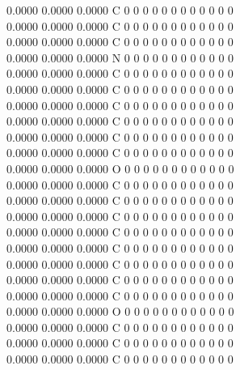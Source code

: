 \documentclass[11pt,titlepage,dvipdfmx,twoside]{article}
\begin{document}
\begin{oframed}
{    0.0000    0.0000    0.0000  C  0  0  0  0  0  0  0  0  0  0  0  0   \\
    0.0000    0.0000    0.0000  C  0  0  0  0  0  0  0  0  0  0  0  0   \\
    0.0000    0.0000    0.0000  C  0  0  0  0  0  0  0  0  0  0  0  0   \\
    0.0000    0.0000    0.0000  N  0  0  0  0  0  0  0  0  0  0  0  0   \\
    0.0000    0.0000    0.0000  C  0  0  0  0  0  0  0  0  0  0  0  0   \\
    0.0000    0.0000    0.0000  C  0  0  0  0  0  0  0  0  0  0  0  0   \\
    0.0000    0.0000    0.0000  C  0  0  0  0  0  0  0  0  0  0  0  0   \\
    0.0000    0.0000    0.0000  C  0  0  0  0  0  0  0  0  0  0  0  0   \\
    0.0000    0.0000    0.0000  C  0  0  0  0  0  0  0  0  0  0  0  0   \\
    0.0000    0.0000    0.0000  C  0  0  0  0  0  0  0  0  0  0  0  0   \\
    0.0000    0.0000    0.0000  O  0  0  0  0  0  0  0  0  0  0  0  0   \\
    0.0000    0.0000    0.0000  C  0  0  0  0  0  0  0  0  0  0  0  0   \\
    0.0000    0.0000    0.0000  C  0  0  0  0  0  0  0  0  0  0  0  0   \\
    0.0000    0.0000    0.0000  C  0  0  0  0  0  0  0  0  0  0  0  0   \\
    0.0000    0.0000    0.0000  C  0  0  0  0  0  0  0  0  0  0  0  0   \\
    0.0000    0.0000    0.0000  C  0  0  0  0  0  0  0  0  0  0  0  0   \\
    0.0000    0.0000    0.0000  C  0  0  0  0  0  0  0  0  0  0  0  0   \\
    0.0000    0.0000    0.0000  C  0  0  0  0  0  0  0  0  0  0  0  0   \\
    0.0000    0.0000    0.0000  C  0  0  0  0  0  0  0  0  0  0  0  0   \\
    0.0000    0.0000    0.0000  O  0  0  0  0  0  0  0  0  0  0  0  0   \\
    0.0000    0.0000    0.0000  C  0  0  0  0  0  0  0  0  0  0  0  0   \\
    0.0000    0.0000    0.0000  C  0  0  0  0  0  0  0  0  0  0  0  0   \\
    0.0000    0.0000    0.0000  C  0  0  0  0  0  0  0  0  0  0  0  0   \\
}
\end{oframed}
\end{document}
